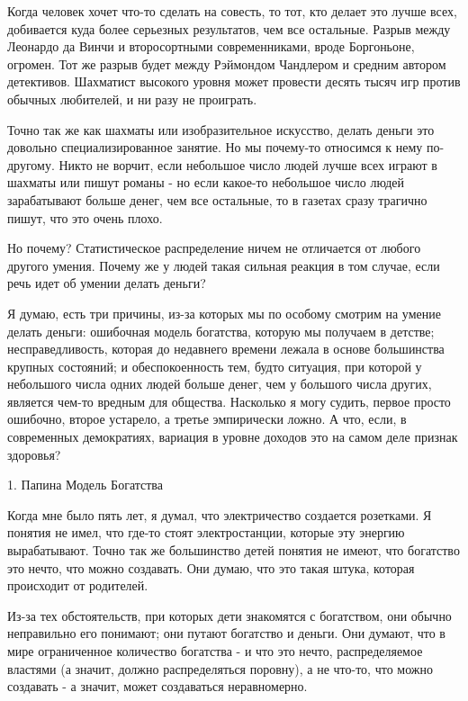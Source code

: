 \documentclass[ebook,12pt,oneside,openany]{memoir}
\begin{document}
\maketitle

Когда человек хочет что-то сделать на совесть, то тот, кто делает это
лучше всех, добивается куда более серьезных результатов, чем все
остальные. Разрыв между Леонардо да Винчи и второсортными
современниками, вроде Боргоньоне, огромен. Тот же разрыв будет между
Рэймондом Чандлером и средним автором детективов. Шахматист высокого
уровня может провести десять тысяч игр против обычных любителей, и ни
разу не проиграть.

Точно так же как шахматы или изобразительное искусство, делать деньги
это довольно специализированное занятие. Но мы почему-то относимся к
нему по-другому. Никто не ворчит, если небольшое число людей лучше
всех играют в шахматы или пишут романы - но если какое-то небольшое
число людей зарабатывают больше денег, чем все остальные, то в газетах
сразу трагично пишут, что это очень плохо.

Но почему? Статистическое распределение ничем не отличается от любого
другого умения. Почему же у людей такая сильная реакция в том случае,
если речь идет об умении делать деньги?

Я думаю, есть три причины, из-за которых мы по особому смотрим на
умение делать деньги: ошибочная модель богатства, которую мы получаем
в детстве; несправедливость, которая до недавнего времени лежала в
основе большинства крупных состояний; и обеспокоенность тем, будто
ситуация, при которой у небольшого числа одних людей больше денег, чем
у большого числа других, является чем-то вредным для общества.
Насколько я могу судить, первое просто ошибочно, второе устарело, а
третье эмпирически ложно. А что, если, в современных демократиях,
вариация в уровне доходов это на самом деле признак здоровья?



1. Папина Модель Богатства

Когда мне было пять лет, я думал, что электричество создается
розетками. Я понятия не имел, что где-то стоят электростанции, которые
эту энергию вырабатывают. Точно так же большинство детей понятия не
имеют, что богатство это нечто, что можно создавать. Они думаю, что
это такая штука, которая происходит от родителей.

Из-за тех обстоятельств, при которых дети знакомятся с богатством, они
обычно неправильно его понимают; они путают богатство и деньги. Они
думают, что в мире ограниченное количество богатства - и что это
нечто, распределяемое властями (а значит, должно распределяться
поровну), а не что-то, что можно создавать - а значит, может
создаваться неравномерно.
\end{document}
